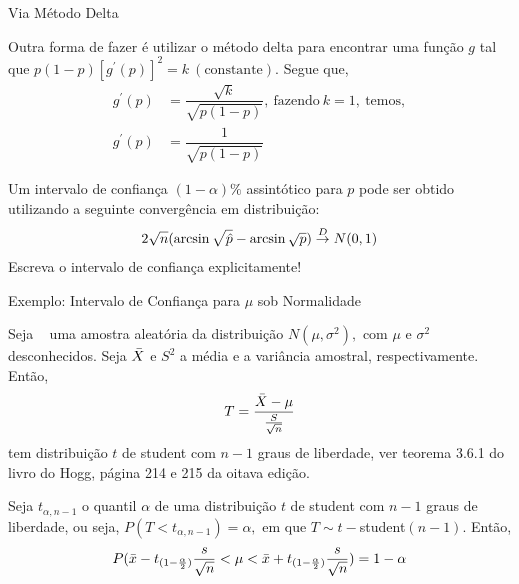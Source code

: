 \documentclass[12pt]{beamer}
\begin{document}
\begin{frame}{Via Método Delta}
\begin{block}{}
\justifying
Outra forma de fazer é utilizar o método delta para encontrar uma função $g$ tal que $p(1-p)[g^{'}(p)]^{2}=k~(\text{constante}).$ Segue que,
\begin{align*}
g^{'}(p)&=\dfrac{\sqrt{k}}{\sqrt{p(1-p)}},~\text{fazendo}~k=1,~\text{temos},\\
g^{'}(p)&=\dfrac{1}{\sqrt{p(1-p)}}
\end{align*}
\end{block}
\end{frame}

\begin{frame}{\Home}
\begin{block}{}
\justifying
Um intervalo de confiança $(1-\alpha)\%$ assintótico para $p$ pode ser obtido utilizando a seguinte convergência em distribuição:
\begin{align*}
    2\sqrt{n}(\arcsin{\sqrt{\hat{p}}}-\arcsin{\sqrt{p}})\overset{D}{\rightarrow} N(0,1)
\end{align*}
Escreva o intervalo de confiança explicitamente!
\end{block}
\end{frame}

\begin{frame}{Exemplo: Intervalo de Confiança para $\mu$ sob Normalidade}
\begin{block}{}
\justifying
Seja \seqX~ uma amostra aleatória da distribuição $N(\mu,\sigma^{2}),$ com $\mu$ e $\sigma^{2}$ desconhecidos. Seja $\Bar{X}$ e $S^{2}$ a média e a variância amostral, respectivamente. Então,
$$T=\dfrac{\Bar{X}-\mu}{\frac{S}{\sqrt{n}}}$$
tem distribuição $t$ de student com $n-1$ graus de liberdade, ver teorema 3.6.1 do livro do Hogg, página 214 e 215 da oitava edição.
\end{block}
\end{frame}

\begin{frame}{}
\begin{block}{}
\justifying
Seja $t_{\alpha,n-1}$ o quantil $\alpha$ de uma distribuição $t$ de student com $n-1$ graus de liberdade, ou seja, $P(T<t_{\alpha,n-1})=\alpha,$ em que $T\sim t-$student$(n-1).$ Então,
\begin{align*}
    P(\Bar{x}-t_{(1-\frac{\alpha}{2})}\dfrac{s}{\sqrt{n}}<\mu<\Bar{x}+t_{(1-\frac{\alpha}{2})}\dfrac{s}{\sqrt{n}})=1-\alpha
\end{align*}
\end{block}
\end{frame}
\end{document}
